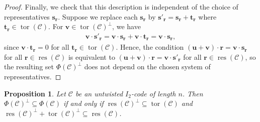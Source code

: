 \documentclass[12pt]{article}
\newtheorem{proposition}[proposition]{Proposition}
\theoremstyle{definition}
\theoremstyle{plain}
\newcommand{\Blue}[1]{{ \color{blue} #1}}
\begin{document}
\begin{proof}
Finally, we check that this description is independent of the choice of
representatives $\mathbf{s}_{\mathbf{r}}$. Suppose we replace each
$\mathbf{s}_{\mathbf{r}}$ by
$
\mathbf{s}'_{\mathbf{r}} = \mathbf{s}_{\mathbf{r}} + \mathbf{t}_{\mathbf{r}}
$
where $\mathbf{t}_{\mathbf{r}} \in \operatorname{tor}(\mathcal{C})$.
For $\mathbf{v} \in \operatorname{tor}(\mathcal{C})^\perp$, we have
\begin{align*}
\mathbf{v} \cdot \mathbf{s}'_{\mathbf{r}}
=
\mathbf{v} \cdot \mathbf{s}_{\mathbf{r}}
+
\mathbf{v} \cdot \mathbf{t}_{\mathbf{r}}
=
\mathbf{v} \cdot \mathbf{s}_{\mathbf{r}},
\end{align*}
since $\mathbf{v} \cdot \mathbf{t}_{\mathbf{r}} = 0$ for all
$\mathbf{t}_{\mathbf{r}} \in \operatorname{tor}(\mathcal{C})$. Hence, the condition
$
(\mathbf{u} + \mathbf{v}) \cdot \mathbf{r}
=
\mathbf{v} \cdot \mathbf{s}_{\mathbf{r}}
$
for all $\mathbf{r} \in \operatorname{res}(\mathcal{C})$
is equivalent to
$
(\mathbf{u} + \mathbf{v}) \cdot \mathbf{r}
=
\mathbf{v} \cdot \mathbf{s}'_{\mathbf{r}}
$
for all $\mathbf{r} \in \operatorname{res}(\mathcal{C})
$,
so the resulting set $\Phi(\mathcal{C})^\perp$ does not depend on the chosen
system of representatives.
\end{proof}




\begin{proposition}  \label{thm:resCdual subset of resC}
Let $\mathcal{C}$ be an untwisted $I_2$-code of length $n$.  Then $\Phi(\mathcal{C})^\perp \subseteq \Phi(\mathcal{C})$ if and only if $\operatorname{res} (\mathcal{C})^\perp \subseteq \operatorname{tor} (\mathcal{C})$ and $\operatorname{res} (\mathcal{C})^\perp + \operatorname{tor} (\mathcal{C})^\perp \subseteq \operatorname{res} (\mathcal{C})$.
\end{proposition}
\end{document}
